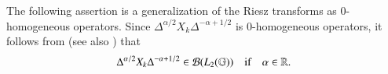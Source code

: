 \documentclass[leqno]{amsart}
\begin{document}
	The following assertion is a generalization of the Riesz transforms as 0-homogeneous operators.
	Since $\Delta^{\alpha/2}X_{k}\Delta^{-\alpha+1/2}$ is 0-homogeneous operators, it follows from \cite[Theorem 3.2.30]{FR-Book} (see also \cite{CG1984}) that
	\begin{align}\label{0-order-bd}
		\Delta^{\alpha/2}X_{k}\Delta^{-\alpha+1/2}\in{\mathcal B}(L_{2}(\mathbb{G}))
		\quad \mbox{if}\quad\alpha\in\mathbb{R}.
	\end{align}
	
	
	
\end{document}

